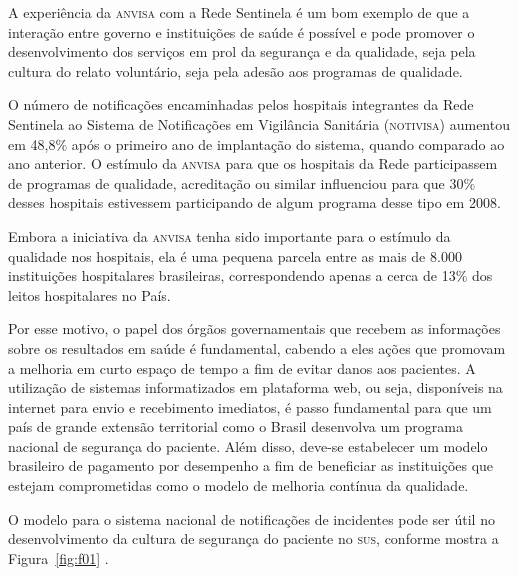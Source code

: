 \documentclass{article}
\begin{document}

A experiência da \textsc{anvisa} com a Rede Sentinela é um bom exemplo de que a interação entre
        governo e instituições de saúde é possível e pode promover o desenvolvimento dos serviços em
        prol da segurança e da qualidade, seja pela cultura do relato voluntário, seja pela adesão
        aos programas de qualidade.

O número de notificações encaminhadas pelos hospitais integrantes da Rede Sentinela ao
        Sistema de Notificações em Vigilância Sanitária (\textsc{notivisa}) aumentou em 48,8\% após o primeiro
        ano de implantação do sistema, quando comparado ao ano anterior. O estímulo da \textsc{anvisa} para
        que os hospitais da Rede participassem de programas de qualidade, acreditação ou similar
        influenciou para que 30\% desses hospitais estivessem participando de algum programa desse
        tipo em 2008. %


Embora a iniciativa da \textsc{anvisa} tenha sido importante para o estímulo da qualidade nos
        hospitais, ela é uma pequena parcela entre as mais de 8.000 instituições hospitalares
        brasileiras, correspondendo apenas a cerca de 13\% dos leitos hospitalares no País. %


Por esse motivo, o papel dos órgãos governamentais que recebem as informações sobre os
        resultados em saúde é fundamental, cabendo a eles ações que promovam a melhoria em curto
        espaço de tempo a fim de evitar danos aos pacientes. A utilização de sistemas informatizados
        em plataforma web, ou seja, disponíveis na internet para envio e recebimento imediatos, é
        passo fundamental para que um país de grande extensão territorial como o Brasil desenvolva
        um programa nacional de segurança do paciente. Além disso, deve-se estabelecer um modelo
        brasileiro de pagamento por desempenho a fim de beneficiar as instituições que estejam
        comprometidas como o modelo de melhoria contínua da qualidade.

O modelo para o sistema nacional de notificações de incidentes pode ser útil no
        desenvolvimento da cultura de segurança do paciente no \textsc{sus}, conforme mostra a %
Figura~\ref{fig:f01}
 .
\end{document}
